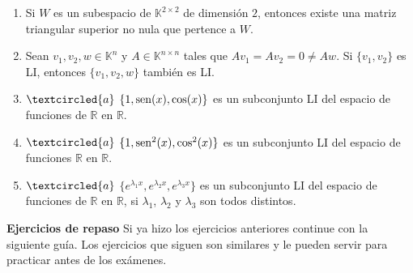\begin{enumerate}[resume, topsep=6pt, itemsep=.4cm]
\begin{enumerate}
  \item Si $W$ es un subespacio de $\mathbb{K}^{2\times2}$ de dimensión $2$, entonces existe una matriz triangular superior no nula que pertence a $W$.

 \item Sean $v_1, v_2, w\in \mathbb{K}^{n}$ y $A\in\mathbb{K}^{n\times n}$ tales que $Av_1=Av_2=0\neq Aw$. Si $\{v_1, v_2\}$ es LI, entonces $\{v_1,v_2,w\}$ también es LI.

\item\label{cos} $\textcircled{a}$ $\{1,{\rm sen}(x),\cos(x)\}$ es un subconjunto LI del espacio de funciones de $\mathbb{R}$ en $\mathbb{R}$.

\item\label{cos2} $\textcircled{a}$ $\{1,{\rm sen}^2(x),\cos^2(x)\}$ es un subconjunto LI del espacio de funciones $\mathbb{R}$ en $\mathbb{R}$.

\item\label{exponencial} $\textcircled{a}$ $\{e^{\lambda_1x},e^{\lambda_2x},e^{\lambda_3x}\}$ es un subconjunto LI del espacio de funciones de
$\mathbb{R}$ en $\mathbb{R}$, si $\lambda_1$, $\lambda_2$ y $\lambda_3$ son todos distintos.
\end{enumerate}

%



\end{enumerate}


\textbf{Ejercicios de repaso}
Si ya hizo los ejercicios anteriores continue con la siguiente guía. Los ejercicios que siguen son similares y le pueden servir para practicar antes de los exámenes.


